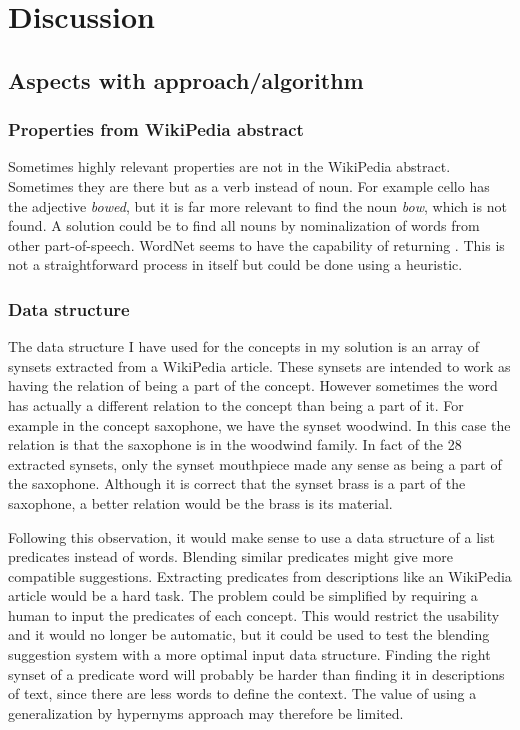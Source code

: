 
\chapter{Discussion} %

\label{Chapter8} %


\section{Aspects with approach/algorithm}

\subsection{Properties from WikiPedia abstract}
Sometimes highly relevant properties are not in the WikiPedia abstract. Sometimes they are there but as a verb instead of noun. For example cello has the adjective \emph{bowed}, but it is far more relevant to find the noun \emph{bow}, which is not found. A solution could be to find all nouns by nominalization of words from other part-of-speech. WordNet seems to have the capability of returning . This is not a straightforward process in itself but could be done using a heuristic.


\subsection{Data structure}
The data structure I have used for the concepts in my solution is an array of synsets extracted from a WikiPedia article. These synsets are intended to work as having the relation of being a part of the concept. However sometimes the word has actually a different relation to the concept than being a part of it. For example in the concept saxophone, we have the synset woodwind. In this case the relation is that the saxophone is in the woodwind family. In fact of the 28 extracted synsets, only the synset mouthpiece made any sense as being a part of the saxophone. Although it is correct that the synset brass is a part of the saxophone, a better relation would be the brass is its material.

Following this observation, it would make sense to use a data structure of a list predicates instead of words. Blending similar predicates might give more compatible suggestions. Extracting predicates from descriptions like an WikiPedia article would be a hard task. The problem could be simplified by requiring a human to input the predicates of each concept. This would restrict the usability and it would no longer be automatic, but it could be used to test the blending suggestion system with a more optimal input data structure. Finding the right synset of a predicate word will probably be harder than finding it in descriptions of text, since there are less words to define the context. The value of using a generalization by hypernyms approach may therefore be limited.

